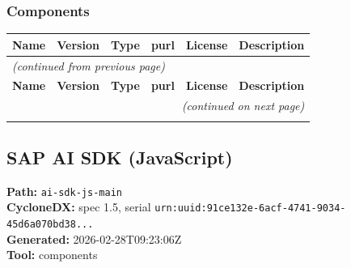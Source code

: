 \documentclass[11pt,a4paper]{article}
\begin{document}
\subsubsection*{Components}
\begin{longtable}{|p{4cm}|p{2cm}|p{1.6cm}|p{5cm}|p{1.5cm}|p{3.5cm}|}
\toprule
\rowcolor{sbomhdr}\textbf{Name} & \textbf{Version} & \textbf{Type} & \textbf{purl} & \textbf{License} & \textbf{Description} \\
\midrule
\endfirsthead
\multicolumn{6}{l}{\small\itshape (continued from previous page)} \\
\toprule
\rowcolor{sbomhdr}\textbf{Name} & \textbf{Version} & \textbf{Type} & \textbf{purl} & \textbf{License} & \textbf{Description} \\
\midrule
\endhead
\midrule
\multicolumn{6}{r}{\small\itshape (continued on next page)} \\
\endfoot
\bottomrule
\endlastfoot
\end{longtable}

\subsection{SAP AI SDK (JavaScript)}
\textbf{Path:} \texttt{ai-sdk-js-main}
\\ \textbf{CycloneDX:} spec 1.5, serial \texttt{urn:uuid:91ce132e-6acf-4741-9034-45d6a070bd38...}
\\ \textbf{Generated:} 2026-02-28T09:23:06Z
\\ \textbf{Tool:} components
\end{document}
